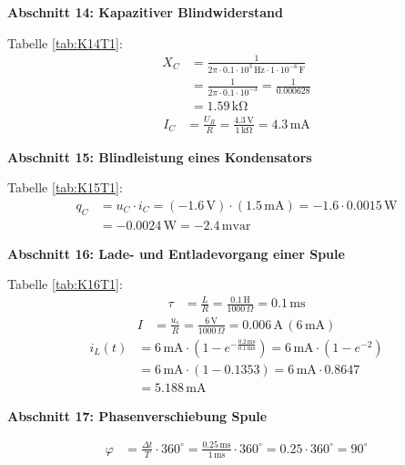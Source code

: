 \large \textbf{Abschnitt 14: Kapazitiver Blindwiderstand}

Tabelle \ref{tab:K14T1}:
\begin{align*}
    X_C &= \frac{1}{2 \pi \cdot 0.1 \cdot 10^3 \, \mathrm{Hz} \cdot 1 \cdot 10^{-6} \, \mathrm{F}} \\
    &= \frac{1}{2 \pi \cdot 0.1 \cdot 10^{-3}} = \frac{1}{0.000628} \\
    &= 1.59 \, \mathrm{k\Omega}
\end{align*}
\begin{align*}
    I_C &= \frac{U_R}{R} = \frac{4.3 \, \mathrm{V}}{1 \, \mathrm{k\Omega}} = 4.3 \, \mathrm{mA}
\end{align*}

\large \textbf{Abschnitt 15: Blindleistung eines Kondensators}

Tabelle \ref{tab:K15T1}:
\begin{align*}
    q_C &= u_C \cdot i_C = (-1.6 \, \mathrm{V}) \cdot (1.5 \, \mathrm{mA}) = -1.6 \cdot 0.0015 \, \mathrm{W} \\
    &= -0.0024 \, \mathrm{W} = -2.4 \, \mathrm{mvar}
\end{align*}

\vspace{2cm}

\large \textbf{Abschnitt 16: Lade- und Entladevorgang einer Spule}

Tabelle \ref{tab:K16T1}:
\begin{align*}
    \tau &= \frac{L}{R} = \frac{0.1 \, \mathrm{H}}{1000 \, \Omega} = 0.1 \, \mathrm{ms}
\end{align*}
\begin{align*}
    I &= \frac{u_s}{R} = \frac{6 \, \mathrm{V}}{1000 \, \Omega} = 0.006 \, \mathrm{A} \, (6 \, \mathrm{mA})
\end{align*}
\begin{align*}
    i_L(t) &= 6 \, \mathrm{mA} \cdot \left( 1 - e^{-\frac{0.2 \, \mathrm{ms}}{0.1 \, \mathrm{ms}}} \right) = 6 \, \mathrm{mA} \cdot \left( 1 - e^{-2} \right) \\
    &= 6 \, \mathrm{mA} \cdot \left( 1 - 0.1353 \right) = 6 \, \mathrm{mA} \cdot 0.8647 \\
    &= 5.188 \, \mathrm{mA}
\end{align*}

\large \textbf{Abschnitt 17: Phasenverschiebung Spule}

\begin{align*}
    \varphi &= \frac{\Delta t}{T} \cdot 360^\circ = \frac{0.25 \, \mathrm{ms}}{1 \, \mathrm{ms}} \cdot 360^\circ = 0.25 \cdot 360^\circ = 90^\circ
\end{align*}


